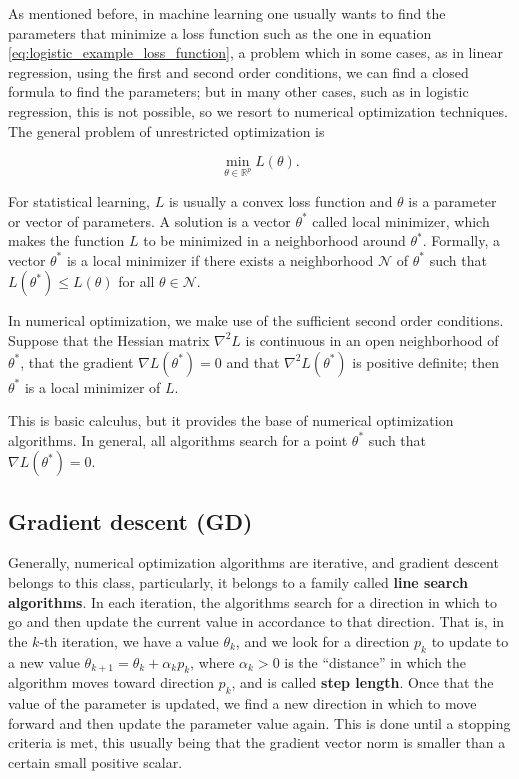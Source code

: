 As mentioned before, in machine learning one usually wants to find the parameters that minimize a loss function such as the one in equation \ref{eq:logistic_example_loss_function}, a problem which in some cases, as in linear regression, using the first and second order conditions, we can find a closed formula to find the parameters; but in many other cases, such as in logistic regression, this is not possible, so we resort to numerical optimization techniques.
The general problem of unrestricted optimization \cite{nocedal2006numerical} is

\begin{equation*}
  \min_{\theta \in \mathbb{R}^p} L(\theta).
\end{equation*}


For statistical learning, $L$ is usually a convex loss function and $\theta$ is a parameter or vector of parameters. A solution is a vector $\theta^*$ called local minimizer, which makes the function $L$ to be minimized in a neighborhood around $\theta^*$. Formally, a vector $\theta^*$ is a local minimizer if there exists a neighborhood $\mathcal{N}$ of $\theta^*$ such that $L(\theta^*) \leq L(\theta)$ for all $\theta \in \mathcal{N}$.

In numerical optimization, we make use of the sufficient second order conditions. Suppose that the Hessian matrix $\nabla^2 L$ is continuous in an open neighborhood of $\theta^*$, that the gradient $\nabla L(\theta^*) = 0$ and that $\nabla^2 L(\theta^*)$ is positive definite; then $\theta^*$ is a local minimizer of $L$.

This is basic calculus, but it provides the base of numerical optimization algorithms. In general, all algorithms search for a point $\theta^*$ such that $\nabla L(\theta^*) = 0$.



\subsection{Gradient descent (GD)}

Generally, numerical optimization algorithms are iterative, and gradient descent belongs to this class, particularly, it belongs to a family called \textbf{line search algorithms}. In each iteration, the algorithms search for a direction in which to go and then update the current value in accordance to that direction. That is, in the $k$-th iteration, we have a value $\theta_k$, and we look for a direction $p_k$ to update to a new value $\theta_{k+1} = \theta_k + \alpha_k p_k$, where $\alpha_k > 0$ is the ``distance'' in which the algorithm moves toward direction $p_k$, and is called \textbf{step length}. Once that the value of the parameter is updated, we find a new direction in which to move forward and then update the parameter value again. This is done until a stopping criteria is met, this usually being that the gradient vector norm is smaller than a certain small positive scalar.

